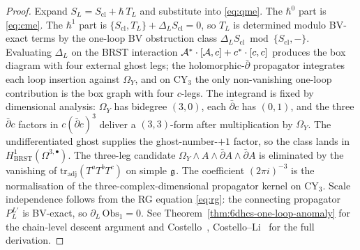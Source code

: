 \begin{proof}
Expand $S_{L} = S_{\mathrm{cl}} + \hbar\,T_{L}$ and substitute into
\eqref{eq:qme}. The $\hbar^{0}$ part is \eqref{eq:cme}. The $\hbar^{1}$
part is
$\{S_{\mathrm{cl}},T_{L}\} + \Delta_{L}S_{\mathrm{cl}} = 0$,
so $T_{L}$ is determined modulo BV-exact terms by the one-loop BV
obstruction class
$\Delta_{L}S_{\mathrm{cl}}\bmod\{S_{\mathrm{cl}},-\}$.
Evaluating $\Delta_{L}$ on the BRST interaction
$\mathcal{A}^{*}\cdot[\mathcal{A},c] + c^{*}\cdot[c,c]$ produces the box diagram with
four external ghost legs; the holomorphic-$\bar\partial$ propagator
integrates each loop insertion against $\Omega_{Y}$, and on $\mathrm{CY}_{3}$
the only non-vanishing one-loop contribution is the box graph with
four $c$-legs. The integrand is fixed by dimensional analysis:
$\Omega_{Y}$ has bidegree $(3,0)$, each $\bar\partial c$ has $(0,1)$,
and the three $\bar\partial c$ factors in
\(c(\bar\partial c)^3\) deliver a $(3,3)$-form after multiplication
by \(\Omega_Y\). The undifferentiated ghost supplies the
ghost-number-$+1$ factor, so the class lands in
$H^{1}_{\mathrm{BRST}}(\Omega^{3,\bullet})$. The three-leg candidate
$\Omega_{Y}\wedge A\wedge\bar\partial A\wedge\bar\partial A$ is
eliminated by the vanishing of $\mathrm{tr}_{\mathrm{adj}}(T^{a}T^{b}T^{c})$
on simple $\mathfrak{g}$. The coefficient $(2\pi i)^{-3}$ is the normalisation
of the three-complex-dimensional propagator kernel on $\mathrm{CY}_{3}$. Scale
independence follows from the RG equation \eqref{eq:rg}: the
connecting propagator $P_{L}^{L'}$ is BV-exact, so
$\partial_{L}\,\mathrm{Obs}_{1} = 0$. See Theorem~\ref{thm:6dhcs-one-loop-anomaly}
for the chain-level descent argument and Costello~\cite{Costello2015omega},
Costello--Li~\cite{CL16} for the full derivation.
\end{proof}

